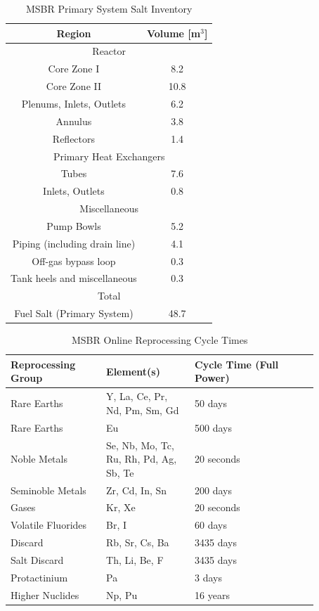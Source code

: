 \begin{table}[H]
\renewcommand{\arraystretch}{1.25}
\caption{MSBR Primary System Salt Inventory \cite{robertson_conceptual_1971}}
\label{tab:msbr_salt_data}
\begin{center}
\begin{tabular}{  c | c  }
 \hline
 Region & Volume [m$^3$]\\
 \hline
 \multicolumn{2}{c}{Reactor}\\
  \hline
 Core Zone I & 8.2\\
 Core Zone II & 10.8\\
 Plenums, Inlets, Outlets & 6.2\\
 Annulus & 3.8\\
 Reflectors & 1.4\\
 \hline
\multicolumn{2}{c}{Primary Heat Exchangers}\\
 \hline
 Tubes & 7.6\\
 Inlets, Outlets & 0.8\\
  \hline
 \multicolumn{2}{c}{Miscellaneous}\\
  \hline
 Pump Bowls & 5.2\\
 Piping (including drain line) & 4.1\\
 Off-gas bypass loop & 0.3\\
 Tank heels and miscellaneous & 0.3\\
 \hline
  \multicolumn{2}{c}{Total}\\
  \hline
 Fuel Salt (Primary System) & 48.7\\
 \hline
\end{tabular}
\end{center}
\end{table}


\begin{table}[H]
\renewcommand{\arraystretch}{1.25}
\caption{MSBR Online Reprocessing Cycle Times \cite{robertson_conceptual_1971}}
\label{tab:msbr_cycle_times}
\begin{center}
\begin{tabular}{ | p{0.27\linewidth} | p{0.25\linewidth} | p{0.35\linewidth} |}
 \hline
 Reprocessing Group & Element(s) & Cycle Time (Full Power)\\
 \hline
 \hline
 Rare Earths & Y, La, Ce, Pr, Nd, Pm, Sm, Gd & 50 days\\
 Rare Earths & Eu & 500 days\\
 Noble Metals  & Se, Nb, Mo, Tc, Ru, Rh, Pd, Ag, Sb, Te & 20 seconds\\
 Seminoble Metals & Zr, Cd, In, Sn &  200 days\\
 Gases & Kr, Xe & 20 seconds\\
 Volatile Fluorides & Br, I & 60 days\\
 Discard & Rb, Sr, Cs, Ba & 3435 days\\
 Salt Discard & Th, Li, Be, F & 3435 days\\
 Protactinium & Pa & 3 days\\
 Higher Nuclides & Np, Pu & 16 years\\
 \hline
\end{tabular}
\end{center}
\end{table}


